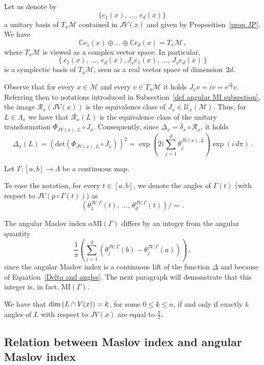 \documentclass[AHL, Unicode, longabstracts, published]{cedram}
\newcommand*\M{\mathcal{M}}
\newcommand*\cR{\mathcal{R}}
\newcommand*\cU{\mathcal{U}}
\newcommand*\cal{\mathcal}
\newcommand{\MI}{\mathrm{MI}}
\newcommand{\rdet}{\mathrm{det}}
\newcommand*\C{\mathbb{C}}
\renewcommand*\dim{{\rm dim}\,}
\begin{document}
Let us denote by
\[
\{ e_1(x),\,\dots,\,e_d(x) \}\,
\]
a unitary basis of $T_x\cal M$ contained in $JV(x)$ and given by Proposition~\ref{prop JP}.
We have
\[
\C e_1(x)\oplus\dots\oplus\C e_d(x)=T_x\M\,,
\]
where $T_x\M$ is viewed as a complex vector space.
In particular,
\[
\left\{ e_1(x),\,\dots,\,e_d(x),J_xe_1(x),\,\dots,\,J_xe_d(x)\right\}
\]
is a symplectic basis of $T_x\M$, seen as a real vector space of dimension~$2d$.

Observe that for every $x\in\M$ and every $v\in T_x\M$ it holds $J_xv=iv=e^{i\frac{\pi}{2}}v$. Referring then to notations introduced in Subsection~\ref{def angular MI subsection}, the image $\cR_x(JV(x))$ is the equivalence class of $J_x\in \cU_x(\M)$. Thus, for $L\in\Lambda_x$ we have that $\cR_x(L)$ is the equivalence class of the unitary transformation $\Phi_{JV(x),L}\circ J_x$. Consequently, since $\Delta_x=\bar\delta_x\circ\cR_x$, it holds
\begin{equation}\label{Delta and angles}
\Delta_x(L)=
\left(\rdet\left(\Phi_{JV(x),L}\circ J_x\right)\right)^2= \exp\left(2i\sum_{j=1}^d\theta_j^{JV(x),L}\right)\exp(i\,d\pi)\,.
\end{equation}


Let $\Gamma:[a,b]\to \Lambda$ be a continuous map.
\begin{nota}
To ease the notation, for every $t\in[a,b]$, we denote the angles of $\Gamma(t)$ (with respect to $JV(p\circ\Gamma(t))$) as
\[
\left(\theta_1^{JV,\Gamma}(t),\,\dots,\,\theta_d^{JV,\Gamma}(t) \right)/\sim\,.
\]
\end{nota}

The angular Maslov index $\alpha\MI(\Gamma)$ differs by an integer from the angular quantity
\begin{equation}\label{relation AMI and angles}
\dfrac{1}{\pi} \left(\sum_{j=1}^d\left(\theta_j^{JV,\Gamma}(b)-\theta_j^{JV,\Gamma}(a)\right)\right)\,,
\end{equation}
since the angular Maslov index is a continuous lift of the function $\Delta$ and because of Equation~\eqref{Delta and angles}. The next paragraph will demonstrate that this integer is, in fact, $\MI(\Gamma)$.



\begin{rema}
We have that $\dim(L\cap V(x))=k$, for some $0\leq k\leq n$, if and only if exactly $k$ angles of $L$ with respect to $JV(x)$ are equal to $\frac \pi 2$.
\end{rema}

\subsection{Relation between Maslov index and angular Maslov index}
\end{document}
